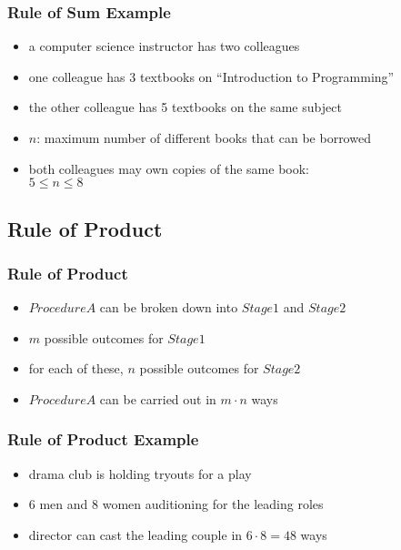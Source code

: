 \documentclass[dvipsnames]{beamer}
\begin{document}
\begin{frame}
  \frametitle{Rule of Sum Example}

  \begin{itemize}
    \item a computer science instructor has two colleagues
    \item one colleague has 3 textbooks on ``Introduction to Programming''
    \item the other colleague has 5 textbooks on the same subject

    \medskip
    \item $n$: maximum number of different books that can be borrowed
    \item both colleagues may own copies of the same book:\\
      $5 \leq n \leq 8$
  \end{itemize}
\end{frame}

\subsection{Rule of Product}

\begin{frame}
  \frametitle{Rule of Product}

  \begin{itemize}
    \item $ProcedureA$ can be broken down into $Stage1$ and $Stage2$
    \item $m$ possible outcomes for $Stage1$
    \item for each of these, $n$ possible outcomes for $Stage2$

    \medskip
    \item $ProcedureA$ can be carried out in $m \cdot n$ ways
  \end{itemize}
\end{frame}

\begin{frame}
  \frametitle{Rule of Product Example}

  \begin{itemize}
    \item drama club is holding tryouts for a play
    \item 6 men and 8 women auditioning for the leading roles

    \medskip
    \item director can cast the leading couple in $6 \cdot 8 = 48$ ways
  \end{itemize}
\end{frame}
\end{document}
